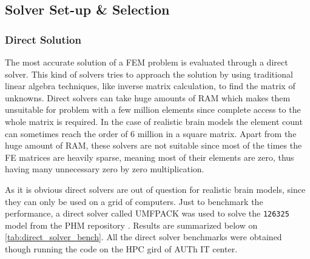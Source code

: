 
\subsection{Solver Set-up \& Selection}

\subsubsection{Direct Solution}

The most accurate solution of a \gls{FEM} problem is evaluated through a direct solver. This kind of solvers tries to approach the solution by using traditional linear algebra techniques, like inverse matrix calculation, to find the matrix of unknowns. Direct solvers can take huge amounts of \gls{RAM} which makes them unsuitable for problem with a few million elements since complete access to the whole matrix is required. In the case of realistic brain models the element count can sometimes reach the order of 6 million in a square matrix. Apart from the huge amount of \gls{RAM}, these solvers are not suitable since most of the times the \gls{FE} matrices are heavily sparse, meaning most of their elements are zero, thus having many unnecessary zero by zero multiplication.

As it is obvious direct solvers are out of question for realistic brain models, since they can only be used on a grid of computers. Just to benchmark the performance, a direct solver called \gls{UMFPACK} \cite{Davis2004_umfpack} was used to solve the \texttt{126325} model from the \gls{PHM} repository \cite{ErikG.Lee2016}. Results are summarized below on \autoref{tab:direct_solver_bench}. All the direct solver benchmarks were obtained though running the code on the \gls{HPC} gird of \gls{AUTh} \gls{IT} center.

